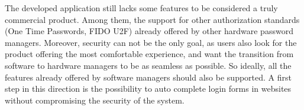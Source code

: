 \vspace{7pt}

The developed application still lacks some features to be considered a truly commercial product. Among them, the support for other authorization standards (One Time Passwords, FIDO U2F) already offered by other hardware password managers. Moreover, security can not be the only goal, as users also look for the product offering the most comfortable experience, and want the transition from software to hardware managers to be as seamless as possible. So ideally, all the features already offered by software managers should also be supported. A first step in this direction is the possibility to auto complete login forms in websites without compromising the security of the system.
